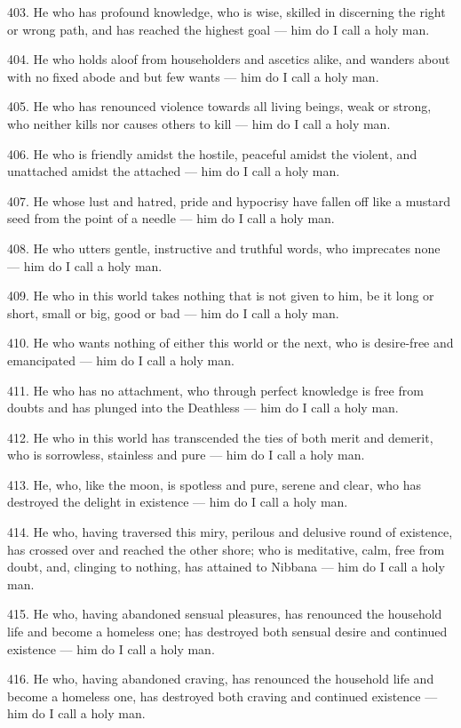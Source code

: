 403. He who has profound knowledge, who is wise, skilled in discerning the right or wrong path, and has reached the highest goal — him do I call a holy man.

404. He who holds aloof from householders and ascetics alike, and wanders about with no fixed abode and but few wants — him do I call a holy man.

405. He who has renounced violence towards all living beings, weak or strong, who neither kills nor causes others to kill — him do I call a holy man.

406. He who is friendly amidst the hostile, peaceful amidst the violent, and unattached amidst the attached — him do I call a holy man.

407. He whose lust and hatred, pride and hypocrisy have fallen off like a mustard seed from the point of a needle — him do I call a holy man.

408. He who utters gentle, instructive and truthful words, who imprecates none — him do I call a holy man.

409. He who in this world takes nothing that is not given to him, be it long or short, small or big, good or bad — him do I call a holy man.

410. He who wants nothing of either this world or the next, who is desire-free and emancipated — him do I call a holy man.

411. He who has no attachment, who through perfect knowledge is free from doubts and has plunged into the Deathless — him do I call a holy man.

412. He who in this world has transcended the ties of both merit and demerit, who is sorrowless, stainless and pure — him do I call a holy man.

413. He, who, like the moon, is spotless and pure, serene and clear, who has destroyed the delight in existence — him do I call a holy man.

414. He who, having traversed this miry, perilous and delusive round of existence, has crossed over and reached the other shore; who is meditative, calm, free from doubt, and, clinging to nothing, has attained to Nibbana — him do I call a holy man.

415. He who, having abandoned sensual pleasures, has renounced the household life and become a homeless one; has destroyed both sensual desire and continued existence — him do I call a holy man.

416. He who, having abandoned craving, has renounced the household life and become a homeless one, has destroyed both craving and continued existence — him do I call a holy man.

